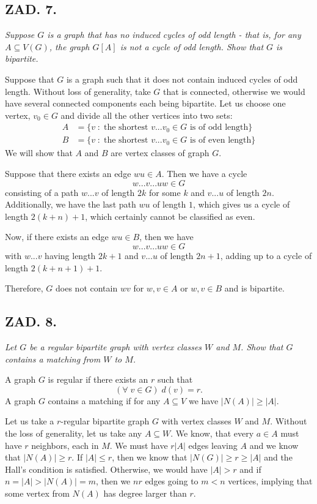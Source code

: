 \documentclass{article}[13pt]
\begin{document}
\subsection*{ZAD. 7.}

\emph{Suppose $G$ is a graph that has no induced cycles of odd length - that is, for any $A\subseteq V(G)$, the graph $G[A]$ is not a cycle of odd length. Show that $G$ is bipartite.}
\medskip

Suppose that $G$ is a graph such that it does not contain induced cycles of odd length. Without loss of generality, take $G$ that is connected, otherwise we would have several connected components each being bipartite. Let us choose one vertex, $v_0\in G$ and divide all the other vertices into two sets:
\begin{align*}
    A&=\{v\;:\;\text{the shortest }v...v_0\in G\text{ is of odd length}\}\\
    B&=\{v\;:\;\text{the shortest }v...v_0\in G\text{ is of even length}\}
\end{align*}
We will show that $A$ and $B$ are vertex classes of graph $G$.

Suppose that there exists an edge $wu\in A$. Then we have a cycle
$$w...v...uw\in G$$
consisting of a path $w...v$ of length $2k$ for some $k$ and $v...u$ of length $2n$. Additionally, we have the last path $wu$ of length $1$, which gives us a cycle of length $2(k+n)+1$, which certainly cannot be classified as even.

Now, if there exists an edge $wu\in B$, then we have
$$w...v...uw\in G$$
with $w...v$ having length $2k+1$ and $v...u$ of length $2n+1$, adding up to a cycle of length $2(k+n+1)+1$. 

Therefore, $G$ does not contain $wv$ for $w,v\in A$ or $w,v\in B$ and is bipartite.

\subsection*{ZAD. 8.}

\emph{Let $G$ be a regular bipartite graph with vertex classes $W$ and $M$. Show that $G$ contains a matching from $W$ to $M$.}
\medskip

A graph $G$ is regular if there exists an $r$ such that 
$$(\forall\;v\in G)\;d(v)=r.$$
A graph $G$ contains a matching if for any $A\subseteq V$ we have $|N(A)|\geq |A|$.
\medskip

Let us take a $r$-regular bipartite graph $G$ with vertex classes $W$ and $M$. Without the loss of generality, let us take any $A\subseteq W$. We know, that every $a\in A$ must have $r$ neighbors, each in $M$. We must have $r|A|$ edges leaving $A$ and we know that $|N(A)|\geq r$. If $|A|\leq r$, then we know that $|N(G)|\geq r\geq |A|$ and the Hall's condition is satisfied. Otherwise, we would have $|A|>r$ and if $n=|A|>|N(A)|=m$, then we $nr$ edges going to $m<n$ vertices, implying that some vertex from $N(A)$ has degree larger than $r$.
\end{document}
